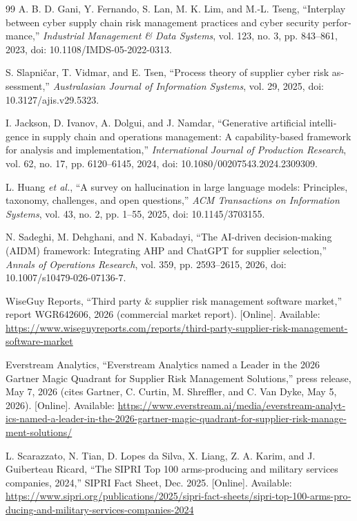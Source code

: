 \begin{otherlanguage}{english}
\begin{thebibliography}{99}
A. B. D. Gani, Y. Fernando, S. Lan, M. K. Lim, and M.-L. Tseng, ``Interplay between cyber supply chain risk management practices and cyber security performance,'' \emph{Industrial Management \& Data Systems}, vol. 123, no. 3, pp. 843--861, 2023, doi: 10.1108/IMDS-05-2022-0313.

S. Slapni{\latinfallback č}ar, T. Vidmar, and E. Tsen, ``Process theory of supplier cyber risk assessment,'' \emph{Australasian Journal of Information Systems}, vol. 29, 2025, doi: 10.3127/ajis.v29.5323.

I. Jackson, D. Ivanov, A. Dolgui, and J. Namdar, ``Generative artificial intelligence in supply chain and operations management: A capability-based framework for analysis and implementation,'' \emph{International Journal of Production Research}, vol. 62, no. 17, pp. 6120--6145, 2024, doi: 10.1080/00207543.2024.2309309.

L. Huang \emph{et al.}, ``A survey on hallucination in large language models: Principles, taxonomy, challenges, and open questions,'' \emph{ACM Transactions on Information Systems}, vol. 43, no. 2, pp. 1--55, 2025, doi: 10.1145/3703155.

N. Sadeghi, M. Dehghani, and N. Kabadayi, ``The AI-driven decision-making (AIDM) framework: Integrating AHP and ChatGPT for supplier selection,'' \emph{Annals of Operations Research}, vol. 359, pp. 2593--2615, 2026, doi: 10.1007/s10479-026-07136-7.

WiseGuy Reports, ``Third party \& supplier risk management software market,'' report WGR642606, 2026 (commercial market report). [Online]. Available: \url{https://www.wiseguyreports.com/reports/third-party-supplier-risk-management-software-market}

Everstream Analytics, ``Everstream Analytics named a Leader in the 2026 Gartner Magic Quadrant for Supplier Risk Management Solutions,'' press release, May 7, 2026 (cites Gartner, C. Curtin, M. Shreffler, and C. Van Dyke, May 5, 2026). [Online]. Available: \url{https://www.everstream.ai/media/everstream-analytics-named-a-leader-in-the-2026-gartner-magic-quadrant-for-supplier-risk-management-solutions/}

L. Scarazzato, N. Tian, D. Lopes da Silva, X. Liang, Z. A. Karim, and J. Guiberteau Ricard, ``The SIPRI Top 100 arms-producing and military services companies, 2024,'' SIPRI Fact Sheet, Dec. 2025. [Online]. Available: \url{https://www.sipri.org/publications/2025/sipri-fact-sheets/sipri-top-100-arms-producing-and-military-services-companies-2024}


\end{thebibliography}
\end{otherlanguage}
